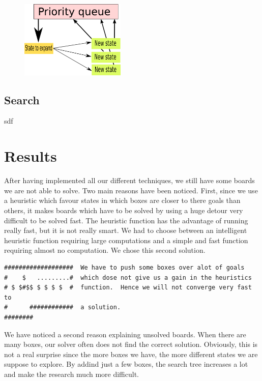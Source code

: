 \documentclass[a4paper,10pt]{article}
\begin{document}
	\begin{figure}[h]
	\centerline{\includegraphics[height=5 cm, width=5cm]{./priority_state.png}}
	\end{figure}


    \subsection{Search}
        sdf~\cite{solving_soko}


\section{Results}
After having implemented all our different techniques, we still have some boards we are not able to solve. Two main reasons have been noticed. First, since we use a heuristic which favour states in which boxes are closer to there goals than others, it makes boards which have to be solved by using a huge detour very difficult to be solved fast. The heuristic function has the advantage of running really fast, but it is not really smart. 
We had to choose between an intelligent heuristic function requiring large computations and a simple and fast function requiring almost no computation. We chose this second solution.
\begin{verbatim}
###################  We have to push some boxes over alot of goals
#    $   .........#  which dose not give us a gain in the heuristics
# $ $#$$ $ $ $ $  #  function.  Hence we will not converge very fast to
#      ############  a solution.
########
\end{verbatim}


We have noticed a second reason explaining unsolved boards. When there are many boxes, our solver often does not find the correct solution. Obviously, this is not a real surprise since the more boxes we have, the more different states we are suppose to explore. By addind just a few boxes, the search tree increases a lot and make the research much more difficult.
\end{document}
